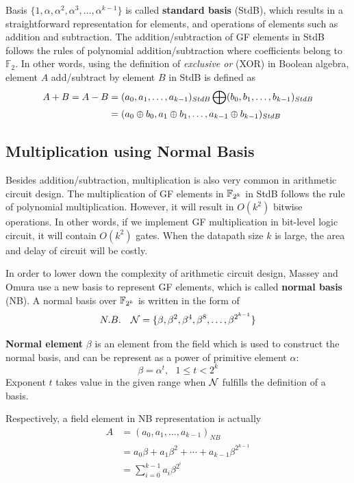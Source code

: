Basis $\{1,\alpha,\alpha^2,\alpha^3,\dots,\alpha^{k-1}\}$ is called {\bf standard basis} (StdB), which results in
a straightforward representation for elements, and operations of elements such as addition and subtraction.
The addition/subtraction of GF elements in StdB follows the rules of polynomial addition/subtraction
where coefficients belong to $\mathbb F_2$. In other words, using the definition of {\it exclusive or} (XOR) in
Boolean algebra, element $A$ add/subtract by element $B$ in StdB is defined as
\begin{align}\label{eqn:StdB}
A+B = A-B &= (a_0,a_1,\dots,a_{k-1})_{StdB} \bigoplus (b_0,b_1,\dots,b_{k-1})_{StdB} \nonumber\\
&=(a_0\oplus b_0, a_1\oplus b_1,\dots,a_{k-1}\oplus b_{k-1})_{StdB} 
\end{align}

\subsection{Multiplication using Normal Basis}
Besides addition/subtraction, multiplication is also very common in arithmetic circuit design.
The multiplication of GF elements in ${\mathbb{F}}_{2^k}$ in StdB follows the rule of polynomial multiplication.
However, it will result in $O(k^2)$ bitwise operations. In other words, if we implement GF multiplication
in bit-level logic circuit, it will contain $O(k^2)$ gates. When the datapath size $k$ is large,
the area and delay of circuit will be costly.

In order to lower down the complexity of arithmetic circuit design, Massey and Omura \cite{MasseyOmura} %
use a new basis to represent GF elements, which is called {\bf normal basis} (NB).
A normal basis over ${\mathbb{F}}_{2^k}$ is written in the form of
\begin{equation*}
N.B. ~~~ {\mathcal{N}} = \{\beta,\beta^2,\beta^4,\beta^8,\dots,\beta^{2^{k-1}}\}
\end{equation*}

{\bf Normal element} $\beta$ is an element from the field which is used to construct the normal basis,
and can be represent as a power of primitive element $\alpha$: 
\begin{equation*}
\beta = \alpha^t, ~~~ 1\leq t<2^k
\end{equation*}
Exponent $t$ takes value in the given range when ${\mathcal{N}}$ fulfills the definition of a basis.

Respectively, a field element in NB representation is actually
\begin{align*}
A &= (a_0,a_1,\dots,a_{k-1})_{NB} \\
  &= a_0\beta+a_1\beta^2+\cdots+a_{k-1}\beta^{2^{k-1}} \\
  &= \sum_{i=0}^{k-1} a_i\beta^{2^i}
\end{align*}

